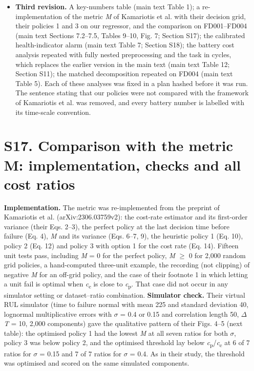 \documentclass[11pt,a4paper]{article}
\begin{document}
\begin{itemize}[leftmargin=1.2em,itemsep=2pt]
\item \textbf{Third revision.} A key-numbers table (main text Table 1); a re-implementation of the metric \textit{M} of Kamariotis et al. with their decision grid, their policies 1 and 3 on our regressor, and the comparison on FD001--FD004 (main text Sections 7.2--7.5, Tables 9--10, Fig. 7; Section S17); the calibrated health-indicator alarm (main text Table 7; Section S18); the battery cost analysis repeated with fully nested preprocessing and the task in cycles, which replaces the earlier version in the main text (main text Table 12; Section S11); the matched decomposition repeated on FD004 (main text Table 5). Each of these analyses was fixed in a plan hashed before it was run. The sentence stating that our policies were not compared with the framework of Kamariotis et al. was removed, and every battery number is labelled with its time-scale convention.
\end{itemize}

\section*{S17. Comparison with the metric M: implementation, checks and all cost ratios}

\noindent \textbf{Implementation.} The metric was re-implemented from the preprint of Kamariotis et al. (arXiv:2306.03759v2): the cost-rate estimator and its first-order variance (their Eqs. 2--3), the perfect policy at the last decision time before failure (Eq. 4), \textit{M} and its variance (Eqs. 6--7, 9), the heuristic policy 1 (Eq. 10), policy 2 (Eq. 12) and policy 3 with option 1 for the cost rate (Eq. 14). Fifteen unit tests pass, including \textit{M} = 0 for the perfect policy, \textit{M} $\ge$ 0 for 2,000 random grid policies, a hand-computed three-unit example, the recording (not clipping) of negative \textit{M} for an off-grid policy, and the case of their footnote 1 in which letting a unit fail is optimal when \textit{c}\textsubscript{c} is close to \textit{c}\textsubscript{p}. That case did not occur in any simulator setting or dataset--ratio combination. \textbf{Simulator check.} Their virtual RUL simulator (time to failure normal with mean 225 and standard deviation 40, lognormal multiplicative errors with $\sigma$ = 0.4 or 0.15 and correlation length 50, $\Delta$\textit{T} = 10, 2,000 components) gave the qualitative pattern of their Figs. 4--5 (next table): the optimised policy 1 had the lowest \textit{M} at all seven ratios for both $\sigma$, policy 3 was below policy 2, and the optimised threshold lay below \textit{c}\textsubscript{p}/\textit{c}\textsubscript{c} at 6 of 7 ratios for $\sigma$ = 0.15 and 7 of 7 ratios for $\sigma$ = 0.4. As in their study, the threshold was optimised and scored on the same simulated components.
\end{document}
